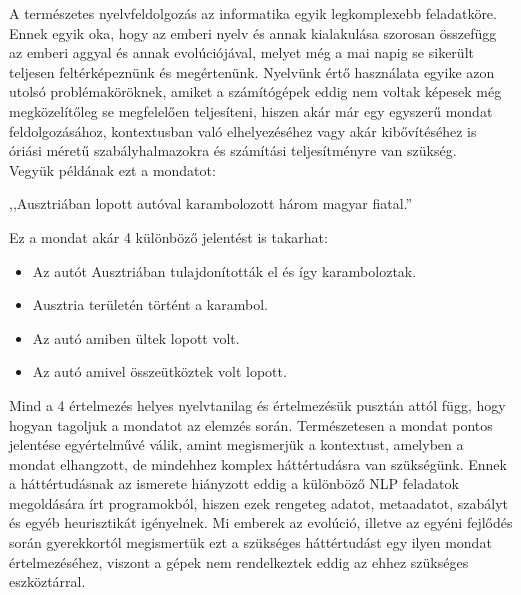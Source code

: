 
A természetes nyelvfeldolgozás az informatika egyik legkomplexebb feladatköre. Ennek egyik oka, hogy az emberi nyelv és annak kialakulása szorosan összefügg az emberi aggyal és annak evolúciójával, melyet még a mai napig se sikerült teljesen feltérképeznünk és megértenünk. Nyelvünk értő használata egyike azon utolsó problémaköröknek, amiket a számítógépek eddig nem voltak képesek még megközelítőleg se megfelelően teljesíteni, hiszen akár már egy egyszerű mondat feldolgozásához, kontextusban való elhelyezéséhez vagy akár kibővítéséhez is óriási méretű szabályhalmazokra és számítási teljesítményre van szükség.\\
Vegyük példának ezt a mondatot:

\vspace{0.5cm}
\centerline{,,Ausztriában lopott autóval karambolozott három magyar fiatal.''}
\vspace{0.5cm}

\noindent Ez a mondat akár 4 különböző jelentést is takarhat:

\begin{itemize}
\item Az autót Ausztriában tulajdonították el és így karamboloztak.
\item Ausztria területén történt a karambol.
\item Az autó amiben ültek lopott volt.
\item Az autó amivel összeütköztek volt lopott.
\end{itemize}

Mind a 4 értelmezés helyes nyelvtanilag és értelmezésük pusztán attól függ, hogy hogyan tagoljuk a mondatot az elemzés során. Természetesen a mondat pontos jelentése egyértelművé válik, amint megismerjük a kontextust, amelyben a mondat elhangzott, de mindehhez komplex háttértudásra van szükségünk. Ennek a háttértudásnak az ismerete hiányzott eddig a különböző NLP feladatok megoldására írt programokból, hiszen ezek rengeteg adatot, metaadatot, szabályt és egyéb heurisztikát igényelnek. Mi emberek az evolúció, illetve az egyéni fejlődés során gyerekkortól megismertük ezt a szükséges háttértudást egy ilyen mondat értelmezéséhez, viszont a gépek nem rendelkeztek eddig az ehhez szükséges eszköztárral. 

